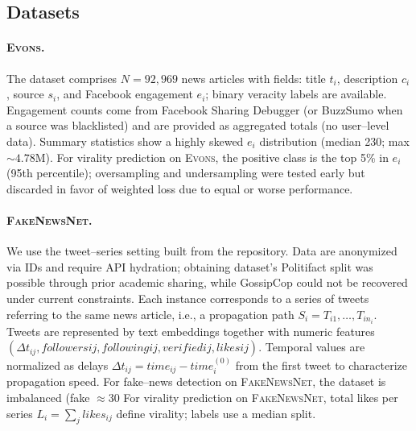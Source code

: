 \subsection{Datasets}

\paragraph{\textsc{Evons}.}
The dataset comprises $N{=}92{,}969$ news articles with fields: title $t_i$, description $c_i$, source $s_i$, and Facebook engagement $e_i$; binary veracity labels are available. Engagement counts come from Facebook Sharing Debugger (or BuzzSumo when a source was blacklisted) and are provided as aggregated totals (no user--level data). Summary statistics show a highly skewed $e_i$ distribution (median 230; max $\sim 4.78$M). For virality prediction on \textsc{Evons}, the positive class is the top 5\% in $e_i$ (95th percentile); oversampling and undersampling were tested early but discarded in favor of weighted loss due to equal or worse performance. 

\paragraph{\textsc{FakeNewsNet}.}
We use the tweet--series setting built from the repository. Data are anonymized via IDs and require API hydration; obtaining dataset's Politifact split was possible through prior academic sharing, while GossipCop could not be recovered under current constraints.
Each instance corresponds to a series of tweets referring to the same news article, i.e., a propagation path $S_i{=}{T_{i1},\dots,T_{i n_i}}$. Tweets are represented by text embeddings together with numeric features $(\Delta t_{ij},\textit{followers}{ij},\textit{following}{ij},\textit{verified}{ij},\textit{likes}{ij})$. Temporal values are normalized as delays $\Delta t_{ij}{=}time_{ij}-time^{(0)}_i$ from the first tweet to characterize propagation speed.
For fake--news detection on \textsc{FakeNewsNet}, the dataset is imbalanced (fake $\approx$30%
For virality prediction on \textsc{FakeNewsNet}, total likes per series $L_i{=}\sum_j \textit{likes}_{ij}$ define virality; labels use a median split.